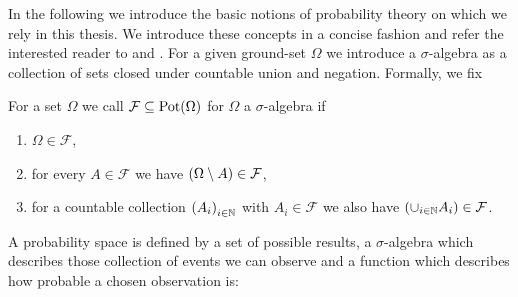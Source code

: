 In the following we introduce the basic notions of probability theory on which
we rely in this thesis. We introduce these concepts in a concise fashion and
refer the interested reader to \cite{Klenke} and \cite{Bauer}.
For a given ground-set $\Omega$ we introduce a $\sigma$-algebra as a collection
of sets closed under countable union and negation. Formally, we fix
\begin{definition}
  For a set $\Omega$ we call $\mathcal{F}\subseteq\operatorname{Pot}(\Omega)$ for $\Omega$ a
  $\sigma$-algebra if
  \begin{enumerate}
    \item $\Omega\in\mathcal{F}$,
    \item for every $A\in\mathcal{F}$ we have $\left(\Omega\setminus A\right)
      \in\mathcal{F}$,
    \item for a countable collection $\left(A_{i}\right)_{i\in\mathbb{N}}$ with
      $A_{i}\in\mathcal{F}$ we also have $\left(\cup_{i\in\mathbb{N}}A_{i}\right)\in
      \mathcal{F}$.
  \end{enumerate}
\end{definition}
A probability space is defined by a set of possible results, a $\sigma$-algebra
which describes those collection of events we can observe and a function which
describes how probable a chosen observation is:
